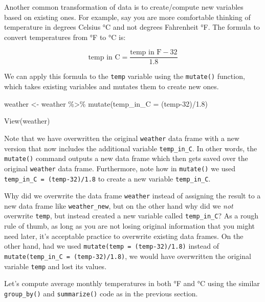 \documentclass[
  letterpaper,
  DIV=11,
  numbers=noendperiod]{scrreprt}
\newenvironment{Shaded}{\begin{snugshade}}{\end{snugshade}}
\newcommand{\AttributeTok}[1]{\textcolor[rgb]{0.40,0.45,0.13}{#1}}
\newcommand{\DecValTok}[1]{\textcolor[rgb]{0.68,0.00,0.00}{#1}}
\newcommand{\FloatTok}[1]{\textcolor[rgb]{0.68,0.00,0.00}{#1}}
\newcommand{\FunctionTok}[1]{\textcolor[rgb]{0.28,0.35,0.67}{#1}}
\newcommand{\NormalTok}[1]{\textcolor[rgb]{0.00,0.23,0.31}{#1}}
\newcommand{\OtherTok}[1]{\textcolor[rgb]{0.00,0.23,0.31}{#1}}
\newcommand{\SpecialCharTok}[1]{\textcolor[rgb]{0.37,0.37,0.37}{#1}}
\theoremstyle{definition}
\theoremstyle{remark}
\begin{document}
Another common transformation of data is to create/compute new variables
based on existing ones. For example, say you are more comfortable
thinking of temperature in degrees Celsius °C and not degrees Fahrenheit
°F. The formula to convert temperatures from °F to °C is:

\[
\text{temp in C} = \frac{\text{temp in F} - 32}{1.8}
\]

We can apply this formula to the \texttt{temp} variable using the
\texttt{mutate()} function, which takes existing variables and mutates
them to create new ones.

\begin{Shaded}
\begin{Highlighting}[]
\NormalTok{weather }\OtherTok{\textless{}{-}}\NormalTok{ weather }\SpecialCharTok{\%\textgreater{}\%} 
  \FunctionTok{mutate}\NormalTok{(}\AttributeTok{temp\_in\_C =}\NormalTok{ (temp}\DecValTok{{-}32}\NormalTok{)}\SpecialCharTok{/}\FloatTok{1.8}\NormalTok{)}

\FunctionTok{View}\NormalTok{(weather)}
\end{Highlighting}
\end{Shaded}

Note that we have overwritten the original \texttt{weather} data frame
with a new version that now includes the additional variable
\texttt{temp\_in\_C}. In other words, the \texttt{mutate()} command
outputs a new data frame which then gets saved over the original
\texttt{weather} data frame. Furthermore, note how in \texttt{mutate()}
we used \texttt{temp\_in\_C\ =\ (temp-32)/1.8} to create a new variable
\texttt{temp\_in\_C}.

Why did we overwrite the data frame \texttt{weather} instead of
assigning the result to a new data frame like \texttt{weather\_new}, but
on the other hand why did we \emph{not} overwrite \texttt{temp}, but
instead created a new variable called \texttt{temp\_in\_C}? As a rough
rule of thumb, as long as you are not losing original information that
you might need later, it's acceptable practice to overwrite existing
data frames. On the other hand, had we used
\texttt{mutate(temp\ =\ (temp-32)/1.8)} instead of
\texttt{mutate(temp\_in\_C\ =\ (temp-32)/1.8)}, we would have
overwritten the original variable \texttt{temp} and lost its values.

Let's compute average monthly temperatures in both °F and °C using the
similar \texttt{group\_by()} and \texttt{summarize()} code as in the
previous section.
\end{document}

